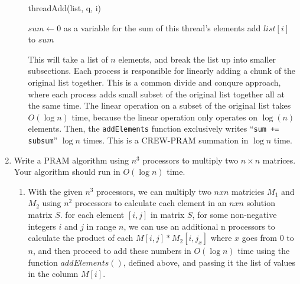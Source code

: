 \documentclass{article}
\renewcommand{\_}{\ifincsname_\else\legacyunderscore\fi}
\begin{document}
\begin{enumerate}
\begin{enumerate}
	\begin{function}
            \DontPrintSemicolon
            \caption{threadAdd(list, q, i)}
            \label{alg:threadAdd}
            $sum \gets 0$ as a variable for the sum of this thread's elements\;
            {
                add $list\left[i\right]$ to $sum$
            }
        \end{function}
This will take a list of $n$ elements, and break the list up into smaller subsections. Each process is responsible for linearly adding a chunk of the original list together. This is a common divide and conqure approach, where each process adds small subset of the original list together all at the same time. The linear operation on a subset of the original list takes $O(\log n)$ time, because the linear operation only operates on $\log(n)$ elements. Then, the \texttt{addElements} function exclusively writes ``\verb|sum += subsum|'' $\log n$ times.  This is a CREW-PRAM summation in $\log n$ time.
	\end{enumerate}

	\item Write a PRAM algorithm using $n^3$ processors to multiply two $n\times n$ matrices. Your algorithm should run in $O(\log n)$ time.
	\begin{enumerate}
		\item With the given $n^3$ processors, we can multiply two $n x n$ matricies $M_1$ and $M_2$ using $n^2$ processors to calculate each element in an $n x n$ solution matrix $S$. for each element $[i, j]$ in matrix $S$, for some non-negative integers $i$ and $j$ in range $n$, we can use an additional n processors to calculate the product of each $M[i, j] * M_2[i, j_x]$ where $x$ goes from $0$ to $n$, and then proceed to add these numbers in $O(\log n)$ time using the function $addElements()$, defined above, and passing it the list of values in the column $M[i]$.
	\end{enumerate}

\end{enumerate}
\end{document}
